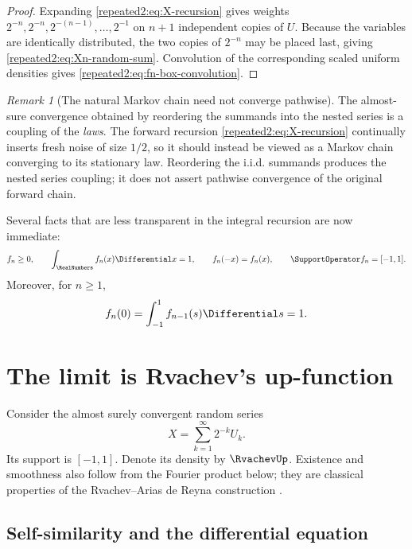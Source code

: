 \documentclass[11pt,oneside]{article}
\theoremstyle{definition}
\theoremstyle{remark}
\newtheorem{remark}[remark]{Remark}
\begin{document}
\begin{proof}
Expanding \eqref{repeated2:eq:X-recursion} gives weights
$2^{-n},2^{-n},2^{-(n-1)},\ldots,2^{-1}$ on $n+1$ independent copies of $U$.
Because the variables are identically distributed, the two copies of $2^{-n}$ may be
placed last, giving \eqref{repeated2:eq:Xn-random-sum}.  Convolution of the corresponding scaled
uniform densities gives \eqref{repeated2:eq:fn-box-convolution}.
\end{proof}

\begin{remark}[The natural Markov chain need not converge pathwise]
The almost-sure convergence obtained by reordering the summands into the nested series is a
coupling of the \emph{laws}.  The forward recursion \eqref{repeated2:eq:X-recursion}
continually inserts fresh noise of size $1/2$, so it should instead be viewed as a Markov
chain converging to its stationary law.  Reordering the i.i.d. summands produces the nested
series coupling; it does not assert pathwise convergence of the original forward chain.
\end{remark}

Several facts that are less transparent in the integral recursion are now immediate:
\begin{equation}
 f_n\ge0,
 \qquad \int_{\RealNumbers}f_n(x)\Differential x=1,
 \qquad f_n(-x)=f_n(x),
 \qquad \SupportOperator f_n=[-1,1].
 \label{repeated2:eq:basic-fn-properties}
\end{equation}
Moreover, for $n\ge1$,
\begin{equation}
 f_n(0)=\int_{-1}^{1}f_{n-1}(s)\Differential s=1.
 \label{repeated2:eq:fn-zero-one}
\end{equation}

\section{The limit is Rvachev's up-function}
\label{repeated2:sec:limit-identification}

Consider the almost surely convergent random series
\begin{equation}
 X=\sum_{k=1}^{\infty}2^{-k}U_k.
 \label{repeated2:eq:up-random-series}
\end{equation}
Its support is $[-1,1]$.  Denote its density by $\RvachevUp$.  Existence and smoothness also follow
from the Fourier product below; they are classical properties of the Rvachev--Arias de
Reyna construction \cite{repeated2:arias1982}.

\subsection{Self-similarity and the differential equation}
\end{document}
